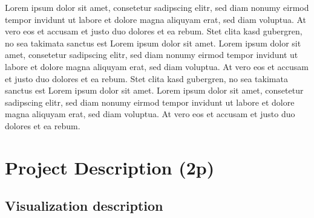 \documentclass[preprint,journal]{vgtc}       %
\begin{document}
Lorem ipsum dolor sit amet, consetetur sadipscing elitr, sed diam
nonumy eirmod tempor invidunt ut labore et dolore magna aliquyam erat,
sed diam voluptua. At vero eos et accusam et justo duo dolores et ea
rebum. Stet clita kasd gubergren, no sea takimata sanctus est Lorem
ipsum dolor sit amet. Lorem ipsum dolor sit amet, consetetur
sadipscing elitr, sed diam nonumy eirmod tempor invidunt ut labore et
dolore magna aliquyam erat, sed diam voluptua. At vero eos et accusam
et justo duo dolores et ea rebum. Stet clita kasd gubergren, no sea
takimata sanctus est Lorem ipsum dolor sit amet. Lorem ipsum dolor sit
amet, consetetur sadipscing elitr, sed diam nonumy eirmod tempor
invidunt ut labore et dolore magna aliquyam erat, sed diam
voluptua. At vero eos et accusam et justo duo dolores et ea
rebum.








\section{Project Description (2p)}

	\subsection{Visualization description}
	
\end{document}
